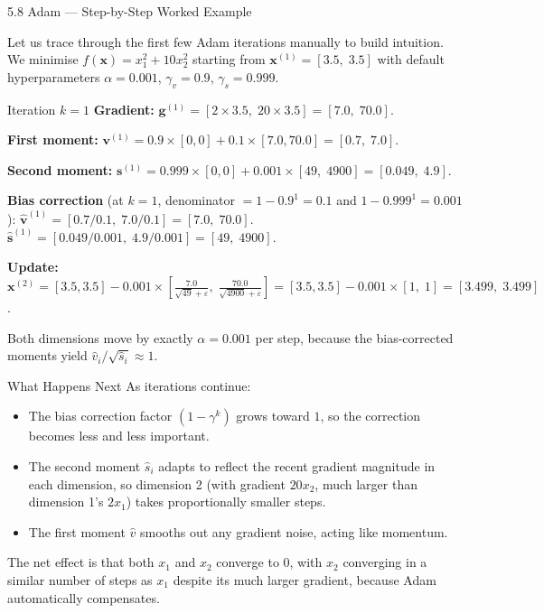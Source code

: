 \documentclass[aspectratio=169,10pt]{beamer}
\newcommand{\vx}{\mathbf{x}}
\newcommand{\vg}{\mathbf{g}}
\newcommand{\vv}{\mathbf{v}}
\newcommand{\vs}{\mathbf{s}}
\begin{document}
\begin{frame}[allowframebreaks]{5.8 Adam --- Step-by-Step Worked Example}

  Let us trace through the first few Adam iterations manually
  to build intuition.  We minimise
  $f(\vx) = x_1^2 + 10x_2^2$ starting from
  $\vx^{(1)} = [3.5,\; 3.5]$ with default hyperparameters
  $\alpha = 0.001$, $\gamma_v = 0.9$, $\gamma_s = 0.999$.

  \begin{exampleblock}{Iteration $k=1$}
    \textbf{Gradient:}
    $\vg^{(1)} = [2\times 3.5,\; 20\times 3.5] = [7.0,\; 70.0]$.

    \textbf{First moment:}
    $\vv^{(1)} = 0.9\times[0,0] + 0.1\times[7.0, 70.0] = [0.7,\; 7.0]$.

    \textbf{Second moment:}
    $\vs^{(1)} = 0.999\times[0,0] + 0.001\times[49,\; 4900] = [0.049,\; 4.9]$.

    \textbf{Bias correction} (at $k=1$, denominator $= 1-0.9^1 = 0.1$ and $1-0.999^1 = 0.001$):
    $\hat{\vv}^{(1)} = [0.7/0.1,\; 7.0/0.1] = [7.0,\; 70.0]$.
    $\hat{\vs}^{(1)} = [0.049/0.001,\; 4.9/0.001] = [49,\; 4900]$.

    \textbf{Update:}
    $\vx^{(2)} = [3.5, 3.5] - 0.001\times
    \left[\frac{7.0}{\sqrt{49}+\varepsilon},\;
          \frac{70.0}{\sqrt{4900}+\varepsilon}\right]
    = [3.5, 3.5] - 0.001\times[1,\; 1]
    = [3.499,\; 3.499]$.

    Both dimensions move by exactly $\alpha = 0.001$ per step, because
    the bias-corrected moments yield $\hat{v}_i / \sqrt{\hat{s}_i} \approx 1$.
  \end{exampleblock}

  \framebreak

  \begin{exampleblock}{What Happens Next}
    As iterations continue:
    \begin{itemize}
      \item The bias correction factor $(1-\gamma^k)$ grows toward $1$,
            so the correction becomes less and less important.
      \item The second moment $\hat{s}_i$ adapts to reflect the recent
            gradient magnitude in each dimension, so dimension 2 (with
            gradient $20x_2$, much larger than dimension 1's $2x_1$)
            takes proportionally smaller steps.
      \item The first moment $\hat{v}$ smooths out any gradient noise,
            acting like momentum.
    \end{itemize}
    The net effect is that both $x_1$ and $x_2$ converge to $0$, with
    $x_2$ converging in a similar number of steps as $x_1$ despite
    its much larger gradient, because Adam automatically compensates.
  \end{exampleblock}

\end{frame}
\end{document}
